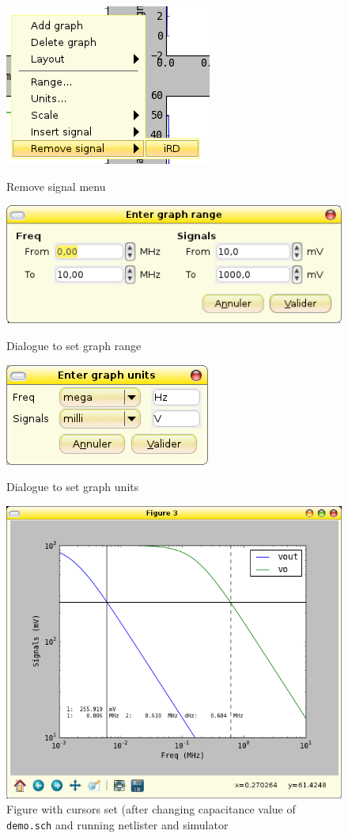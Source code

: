 \documentclass[a4paper,11pt]{article}
\begin{document}
\begin{figure}[htbp]
  \centering
  \includegraphics[scale=.5]{../png/ioscopy-remove.png}
  \caption{Remove signal menu}
  \label{fig:remove}

  \includegraphics[scale=.5]{../png/ioscopy-range.png}
  \caption{Dialogue to set graph range}
  \label{fig:range}

  \includegraphics[scale=.5]{../png/ioscopy-units.png}
  \caption{Dialogue to set graph units}
  \label{fig:units}

  \includegraphics[scale=.5]{../png/ioscopy-cursors.png}
  \caption{Figure with cursors set (after changing capacitance value of \texttt{demo.sch} and running netlister and simulator}
  \label{fig:cursors}

\end{figure}
\end{document}
